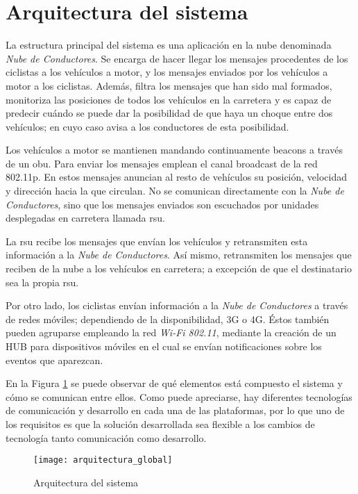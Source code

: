 \section{Arquitectura del sistema}\label{section:arquitecturaSistema}
La estructura principal del sistema es una aplicación en la nube denominada
\emph{Nube de Conductores}. Se encarga de hacer llegar los mensajes procedentes
de los ciclistas a los vehículos a motor, y los mensajes enviados por los vehículos
a motor a los ciclistas. Además, filtra los mensajes que han sido mal formados,
monitoriza las posiciones de todos los vehículos en la carretera y es capaz de
predecir cuándo se puede dar la posibilidad de que haya un choque entre dos vehículos;
en cuyo caso avisa a los conductores de esta posibilidad.

Los vehículos a motor se mantienen mandando continuamente beacons a través de un
\gls{obu}. Para enviar los mensajes emplean el canal broadcast de la red 802.11p.
En estos mensajes anuncian al resto de vehículos su posición, velocidad y dirección
hacia la que circulan. No se comunican directamente con la \emph{Nube de Conductores},
sino que los mensajes enviados son escuchados por unidades desplegadas en carretera
llamada \gls{rsu}.

La \gls{rsu} recibe los mensajes que envían los vehículos y retransmiten esta
información a la \emph{Nube de Conductores}. Así mismo, retransmiten los mensajes
que reciben de la nube a los vehículos en carretera; a excepción de que el
destinatario sea la propia \gls{rsu}.

Por otro lado, los ciclistas envían información a la \emph{Nube de Conductores} a
través de redes móviles; dependiendo de la disponibilidad, 3G o 4G. Éstos también
pueden agruparse empleando la red \emph{Wi-Fi 802.11}, mediante la creación de un
HUB para dispositivos móviles en el cual se envían notificaciones sobre los eventos
que aparezcan.

En la Figura \ref{fig:ArquitecturaSistema} se puede observar de qué elementos está
compuesto el sistema y cómo se comunican entre ellos. Como puede apreciarse, hay
diferentes tecnologías de comunicación y desarrollo en cada una de las plataformas,
por lo que uno de los requisitos es que la solución desarrollada sea flexible a los
cambios de tecnología tanto comunicación como desarrollo.

\begin{figure}[H]
	\begin{center}
		\texttt{[image: arquitectura\_global]}
		\caption{Arquitectura del sistema}
		\label{fig:ArquitecturaSistema}
	 \end{center}
\end{figure}



